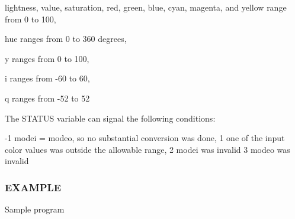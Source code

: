 \begin{DoxyDescription}
\begin{DoxyItemize}
\item lightness, value, saturation, red, green, blue, cyan, magenta, and yellow range from 0 to 100, 
\item hue ranges from 0 to 360 degrees, 
\item y ranges from 0 to 100, 
\item i ranges from -\/60 to 60, 
\item q ranges from -\/52 to 52 
\end{DoxyItemize}



The S\+T\+A\+T\+US variable can signal the following conditions\+: 




\begin{DoxyPre}\end{DoxyPre}



\begin{DoxyPre}    -1   modei = modeo, so no substantial conversion was done,
     1   one of the input color values was outside the allowable range,
     2   modei was invalid
     3   modeo was invalid
 \end{DoxyPre}
 \subsubsection*{E\+X\+A\+M\+P\+LE}


\begin{DoxyPre}\end{DoxyPre}



\begin{DoxyPre}   Sample program\end{DoxyPre}




\end{DoxyDescription}
